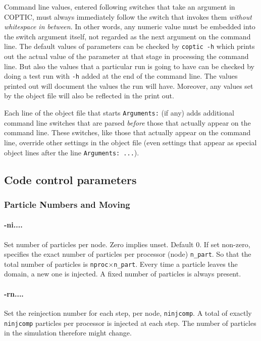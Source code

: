 \documentclass[12pt]{article}
\begin{document}
Command line values, entered following switches that take an argument
in COPTIC, must always immediately follow the switch that invokes them
\emph{without whitespace in between}. In other words, any numeric
value must be embedded into the switch argument itself, not regarded
as the next argument on the command line.  The default values of
parameters can be checked by \verb!coptic -h! which prints out the
actual value of the parameter at that stage in processing the command
line. But also the values that a particular run is going to have can
be checked by doing a test run with \verb!-h! added at the end of the
command line. The values printed out will document the values the run
will have. Moreover, any values set by the object file will also be
reflected in the print out.

Each line of the object file that starts \verb!Arguments:! (if any)
adds additional command line switches that are parsed \emph{before}
those that actually appear on the command line.  These switches, like
those that actually appear on the command line, override other
settings in the object file (even settings that appear as special
object lines after the line
\verb!Arguments: ...!).

\subsection{Code control parameters}

\subsubsection*{Particle Numbers and Moving}

\paragraph{-ni....} Set number of particles per node. Zero implies
unset. Default 0.
If set non-zero, specifies the exact number of particles per processor
(node) \verb!n_part!. So that the total number of particles is \verb!nproc!$\times$\verb!n_part!. Every time a particle leaves the domain, a new one is
injected. A fixed number of particles is always present.

\paragraph{-rn....} Set the reinjection number for each step, per
node, \verb!ninjcomp!. 
A total of exactly \verb!ninjcomp! particles per processor is injected
at each step. The number of particles in the simulation therefore
might change.
\end{document}
